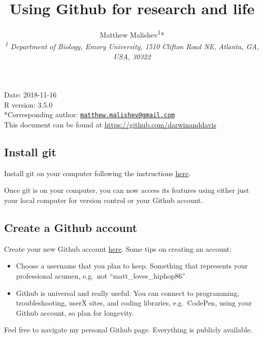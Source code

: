 \documentclass[10,portrait]{article}
\title{Using Github for research and life}
\author{Matthew
Malishev\textsuperscript{1}*\\[2\baselineskip]\emph{\textsuperscript{1}
Department of Biology, Emory University, 1510 Clifton Road NE, Atlanta,
GA, USA, 30322}}
\date{}
\providecommand{\tightlist}{%
  \setlength{\itemsep}{0pt}\setlength{\parskip}{0pt}}
\begin{document}
\maketitle

{
\hypersetup{linkcolor=black}
\setcounter{tocdepth}{4}
\tableofcontents
}
\newpage   

Date: 2018-11-16\\
R version: 3.5.0\\
*Corresponding author:
\href{mailto:matthew.malishev@gmail.com}{\nolinkurl{matthew.malishev@gmail.com}}\\
This document can be found at \url{https://github.com/darwinanddavis}\\
\newpage  

\subsection{Install git}\label{install-git}

Install git on your computer following the instructions
\href{https://git-scm.com/book/en/v2/Getting-Started-Installing-Git}{here}.

Once git is on your computer, you can now access its features using
either just your local computer for version control or your Github
account.

\subsection{Create a Github account}\label{create-a-github-account}

Create your new Github account \href{https://github.com/}{here}. Some
tips on creating an account:

\begin{itemize}
\tightlist
\item
  Choose a username that you plan to keep. Something that represents
  your professional acumen, e.g.~not ``matt\_loves\_hiphop86''\\
  \hspace*{0.333em}
\item
  Github is universal and really useful. You can connect to programming,
  troubleshooting, userX sites, and coding libraries, e.g.~CodePen,
  using your Github account, so plan for longevity.\\
  \hspace*{0.333em}
\end{itemize}

Feel free to navigate my personal Github page. Everything is publicly
available.
\end{document}
